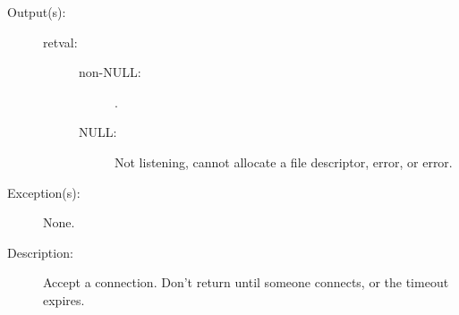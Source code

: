 \begin{description}
\begin{description}
	\item[Output(s): ]
		\begin{description}\item[]
		\item[retval: ]
			\begin{description}\item[]
			\item[non-NULL: ]
				.
			\item[NULL: ]
				Not listening, cannot allocate a file
				descriptor,  error, or
				 error.
			\end{description}
		\end{description}
	\item[Exception(s): ] None.
	\item[Description: ]
		Accept a connection.  Don't return until someone connects, or
		the timeout expires.
	\end{description}
\end{description}
